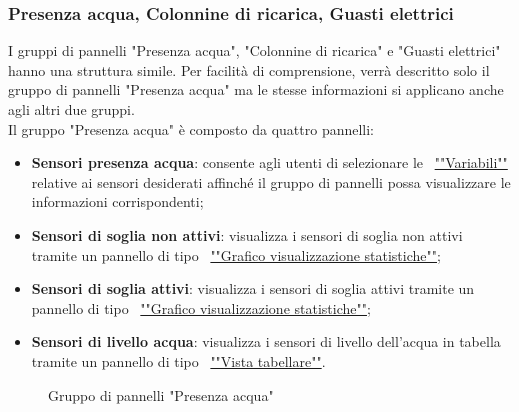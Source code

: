 \subsubsection{Presenza acqua, Colonnine di ricarica, Guasti elettrici}
I gruppi di pannelli "Presenza acqua", "Colonnine di ricarica" e "Guasti elettrici" hanno una struttura simile. Per facilità di comprensione, verrà descritto solo il gruppo di pannelli "Presenza acqua" ma le stesse informazioni si applicano anche agli altri due gruppi.\\
Il gruppo "Presenza acqua" è composto da quattro pannelli:
\begin{itemize}
    \item \textbf{Sensori presenza acqua}: consente agli utenti di selezionare le ~\hyperlink{par:variabili_panel}{""Variabili""} relative ai sensori desiderati affinché il gruppo di pannelli possa visualizzare le informazioni corrispondenti;
    \item \textbf{Sensori di soglia non attivi}: visualizza i sensori di soglia non attivi tramite un pannello di tipo ~\hyperlink{par:visu_stat}{""Grafico visualizzazione statistiche""};
    \item \textbf{Sensori di soglia attivi}: visualizza i sensori di soglia attivi tramite un pannello di tipo ~\hyperlink{par:visu_stat}{""Grafico visualizzazione statistiche""};
    \item \textbf{Sensori di livello acqua}: visualizza i sensori di livello dell'acqua in tabella tramite un pannello di tipo ~\hyperlink{par:tabella}{""Vista tabellare""}.
\end{itemize}
\begin{figure}[H]
    \centering
    \caption{Gruppo di pannelli "Presenza acqua"}
    \label{fig:my_label}
\end{figure}

